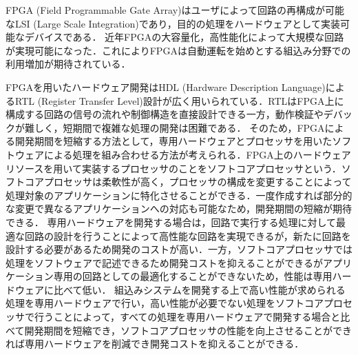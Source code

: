 FPGA (Field Programmable Gate Array)はユーザによって回路の再構成が可能なLSI (Large Scale Integration)であり，目的の処理をハードウェアとして実装可能なデバイスである．
近年FPGAの大容量化，高性能化によって大規模な回路が実現可能になった．これによりFPGAは自動運転を始めとする組込み分野での利用増加が期待されている．

FPGAを用いたハードウェア開発はHDL (Hardware Description Language)によるRTL (Register Transfer Level)設計が広く用いられている．RTLはFPGA上に構成する回路の信号の流れや制御構造を直接設計できる一方，動作検証やデバックが難しく，短期間で複雑な処理の開発は困難である\cite{bib:fpga}．
そのため，FPGAによる開発期間を短縮する方法として，専用ハードウェアとプロセッサを用いたソフトウェアによる処理を組み合わせる方法が考えられる．FPGA上のハードウェアリソースを用いて実装するプロセッサのことをソフトコアプロセッサという．ソフトコアプロセッサは柔軟性が高く，プロセッサの構成を変更することによって処理対象のアプリケーションに特化させることができる．一度作成すれば部分的な変更で異なるアプリケーションへの対応も可能なため，開発期間の短縮が期待できる．
専用ハードウェアを開発する場合は，回路で実行する処理に対して最適な回路の設計を行うことによって高性能な回路を実現できるが，新たに回路を設計する必要があるため開発のコストが高い．一方，ソフトコアプロセッサでは処理をソフトウェアで記述できるため開発コストを抑えることができるがアプリケーション専用の回路としての最適化することができないため，性能は専用ハードウェアに比べて低い．
組込みシステムを開発する上で高い性能が求められる処理を専用ハードウェアで行い，高い性能が必要でない処理をソフトコアプロセッサで行うことによって，すべての処理を専用ハードウェアで開発する場合と比べて開発期間を短縮でき，ソフトコアプロセッサの性能を向上させることができれば専用ハードウェアを削減でき開発コストを抑えることができる．

